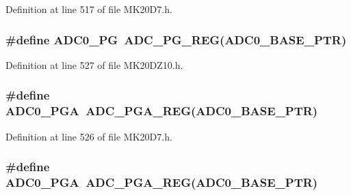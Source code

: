 Definition at line 517 of file M\+K20\+D7.\+h.

\subsubsection[{\texorpdfstring{A\+D\+C0\+\_\+\+PG}{ADC0_PG}}]{\setlength{\rightskip}{0pt plus 5cm}\#define A\+D\+C0\+\_\+\+PG~{\bf A\+D\+C\+\_\+\+P\+G\+\_\+\+R\+EG}({\bf A\+D\+C0\+\_\+\+B\+A\+S\+E\+\_\+\+P\+TR})}\hypertarget{group___a_d_c___register___accessor___macros_ga339951b4f192bd4558b3ddfb0af8fefb}{}\label{group___a_d_c___register___accessor___macros_ga339951b4f192bd4558b3ddfb0af8fefb}


Definition at line 527 of file M\+K20\+D\+Z10.\+h.

\subsubsection[{\texorpdfstring{A\+D\+C0\+\_\+\+P\+GA}{ADC0_PGA}}]{\setlength{\rightskip}{0pt plus 5cm}\#define A\+D\+C0\+\_\+\+P\+GA~{\bf A\+D\+C\+\_\+\+P\+G\+A\+\_\+\+R\+EG}({\bf A\+D\+C0\+\_\+\+B\+A\+S\+E\+\_\+\+P\+TR})}\hypertarget{group___a_d_c___register___accessor___macros_gab2bb602430cbc7596438b356e9f07d87}{}\label{group___a_d_c___register___accessor___macros_gab2bb602430cbc7596438b356e9f07d87}


Definition at line 526 of file M\+K20\+D7.\+h.

\subsubsection[{\texorpdfstring{A\+D\+C0\+\_\+\+P\+GA}{ADC0_PGA}}]{\setlength{\rightskip}{0pt plus 5cm}\#define A\+D\+C0\+\_\+\+P\+GA~{\bf A\+D\+C\+\_\+\+P\+G\+A\+\_\+\+R\+EG}({\bf A\+D\+C0\+\_\+\+B\+A\+S\+E\+\_\+\+P\+TR})}\hypertarget{group___a_d_c___register___accessor___macros_gab2bb602430cbc7596438b356e9f07d87}{}\label{group___a_d_c___register___accessor___macros_gab2bb602430cbc7596438b356e9f07d87}


